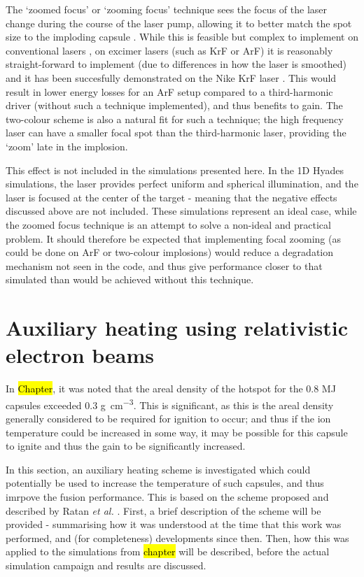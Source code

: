 The `zoomed focus' or `zooming focus' technique sees the focus of the laser change during the course of the laser pump, allowing it to better match the spot size to the imploding capsule \cite{Kehne2013, Eimerl2014}. While this is feasible but complex to implement on conventional lasers \cite{Obenschain2015}, on excimer lasers (such as KrF or ArF) it is reasonably straight-forward to implement (due to differences in how the laser is smoothed) and it has been succesfully demonstrated on the Nike KrF laser \cite{Kehne2013}. This would result in lower energy losses for an ArF setup compared to a third-harmonic driver (without such a technique implemented), and thus benefits to gain. The two-colour scheme is also a natural fit for such a technique; the high frequency laser can have a smaller focal spot than the third-harmonic laser, providing the `zoom' late in the implosion.

This effect is not included in the simulations presented here. In the 1D Hyades simulations, the laser provides perfect uniform and spherical illumination, and the laser is focused at the center of the target - meaning that the negative effects discussed above are not included. These simulations represent an ideal case, while the zoomed focus technique is an attempt to solve a non-ideal and practical problem. It should therefore be expected that implementing focal zooming (as could be done on ArF or two-colour implosions) would reduce a degradation mechanism not seen in the code, and thus give performance closer to that simulated than would be achieved without this technique.

\section{Auxiliary heating using relativistic electron beams}

In \hl{Chapter}, it was noted that the areal density of the hotspot for the 0.8 MJ capsules exceeded 0.3 \unit{\gram\per\centi\meter\cubed}. This is significant, as this is the areal density generally considered to be required for ignition to occur; and thus if the ion temperature could be increased in some way, it may be possible for this capsule to ignite and thus the gain to be significantly increased.

In this section, an auxiliary heating scheme is investigated which could potentially be used to increase the temperature of such capsules, and thus imrpove the fusion performance. This is based on the scheme proposed and described by Ratan \textit{et al.} \cite{Ratan2017}. First, a brief description of the scheme will be provided - summarising how it was understood at the time that this work was performed, and (for completeness) developments since then. Then, how this was applied to the simulations from \hl{chapter} will be described, before the actual simulation campaign and results are discussed.

